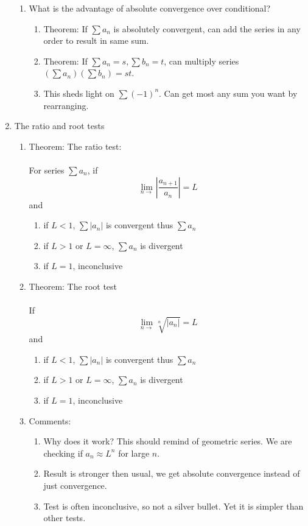 \documentclass{article}
\begin{document}
\begin{enumerate}
\begin{enumerate}
\item What is the advantage of absolute convergence over conditional?
\begin{enumerate}
\item Theorem: If $\sum a_n$ is absolutely convergent, can add the series in any order to result in same sum. 
\item Theorem: If $\sum a_n=s, \sum b_n=t$, can multiply series $\left(\sum a_n \right) \left(\sum b_n \right) = st$. 
\item This sheds light on $\sum (-1)^n$. Can get most any sum you want by rearranging.
\end{enumerate}
\end{enumerate}

\item The ratio and root tests
\begin{enumerate}

\item Theorem: The ratio test: \\ \ \\
For series $\sum a_n$, if 
$$
\lim_{n\rightarrow}\left|\frac{a_{n+1}}{a_n}\right| = L
$$
and
\begin{enumerate}
\item if $L<1$, $\sum |a_n|$ is convergent thus $\sum a_n$
\item if $L>1$ or $L=\infty$, $\sum a_n$ is divergent
\item if $L=1$, inconclusive
\end{enumerate}

\item Theorem: The root test \\ \ \\
If
$$
\lim_{n\rightarrow}\sqrt[n]{|a_n|} = L
$$
and
\begin{enumerate}
\item if $L<1$, $\sum |a_n|$ is convergent thus $\sum a_n$
\item if $L>1$ or $L=\infty$, $\sum a_n$ is divergent
\item if $L=1$, inconclusive
\end{enumerate}

\item Comments:
\begin{enumerate}
\item Why does it work? This should remind of geometric series. We are checking if $a_n \approx L^n$ for large $n$.
\item Result is stronger then usual, we get absolute convergence instead of just convergence.
\item Test is often inconclusive, so not a silver bullet. Yet it is simpler than other tests.
\end{enumerate}


\end{enumerate}
\end{enumerate}
\end{document}
